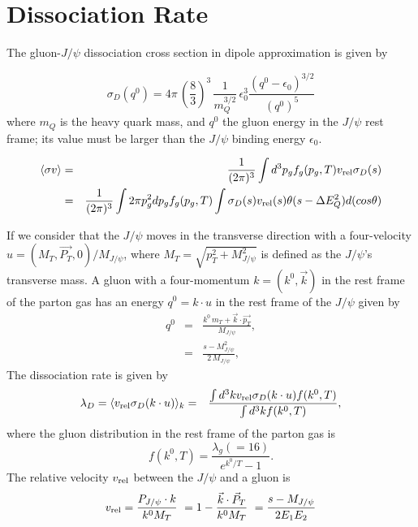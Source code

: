 \documentclass[aps,prc,preprint,superscriptaddress,showpacs,showkeys]{revtex4-1}
\begin{document}
\section{Dissociation Rate}
The gluon-$J/\psi$ dissociation cross section in dipole approximation is given by \cite{ks95}

\begin{equation}
\sigma_{D}(q^{0}) = 4\pi\,\left(\frac{8}{3}\right)^3\,\frac{1}{m_Q^{3/2}}\,\epsilon_0^3 \frac{ (q^0-\epsilon_0)^{3/2}}{(q^0)^5}
\end{equation}
where $m_Q$ is the heavy quark mass, and $q^0$ the gluon energy in the $J/ \psi$ rest
frame; its value must be larger than the $J/\psi$ binding energy
$\epsilon_0$. 

\begin{eqnarray}
\langle \sigma v \rangle &= & \frac{1}{(2\pi)^{3}} \int d^{3}p_{g} f_{g}(p_{g},T) v_{\rm rel} \sigma_{D}(s) \\ \nonumber
 				      &= &\frac{1}{(2\pi)^{3}} \int  2\pi p_{g}^{2} dp_{g} f_{g}(p_{g},T) \int \sigma_{D}(s) v_{\rm rel}(s) \theta(s-\Delta E_{Q}^{2}) d(cos\theta) 
\end{eqnarray}
 
 If we consider that the $J/ \psi$ moves in the transverse direction with a four-velocity
$u=(M_T, \vec{P_T}, 0)/M_{J/\psi}$, where $M_T=\sqrt{p_T^2+M^2_{J/ \psi}}$ is defined as the $J/\psi$'s
transverse mass. A gluon with a four-momentum $k=(k^0,\vec{k})$
in the rest frame of the parton gas has an energy $q^0=k\cdot u$
in the rest frame of the $J/\psi$ given by
\begin{eqnarray}
 q^{0} &= &\frac{k^{0}\,m_{T} + \vec{k} \cdot \vec{p_{T}}}{M_{J/\psi}}, \nonumber \\
       &= &\frac{s-M_{J/\psi}^{2}}{2\,M_{J/\psi}},
\end{eqnarray}
The dissociation rate is given by 
\begin{eqnarray}
\lambda_D = \langle v_{\rm rel} \sigma_{D} (k \cdot u)\rangle_k &= &\frac{\int d^3k v_{\rm rel} \sigma_{D} (k \cdot u) f(k^0,T)}{\int d^3k f(k^0,T)},
 \label{eq5}
\end{eqnarray}
where the gluon distribution in the rest frame of the parton gas is
\begin{equation}
  f(k^0,T)=\frac{\lambda_g(=16)}{e^{k^0/T}-1} \label{eq6}.
\end{equation}
The relative velocity $v_{\rm rel}$ between the $J/\psi$ and a gluon is
\begin{eqnarray}
 v_{\rm rel}  =  \frac{P_{J/\psi}\cdot k}{k^0M_T} \,\,
              =  1-\frac{\vec{k}\cdot\vec{P}_T}{k^0M_T} \,\,
              =  {s- M_{J/\psi} \over 2E_1E_2}  
\label{eq7}
\end{eqnarray}
\end{document}
